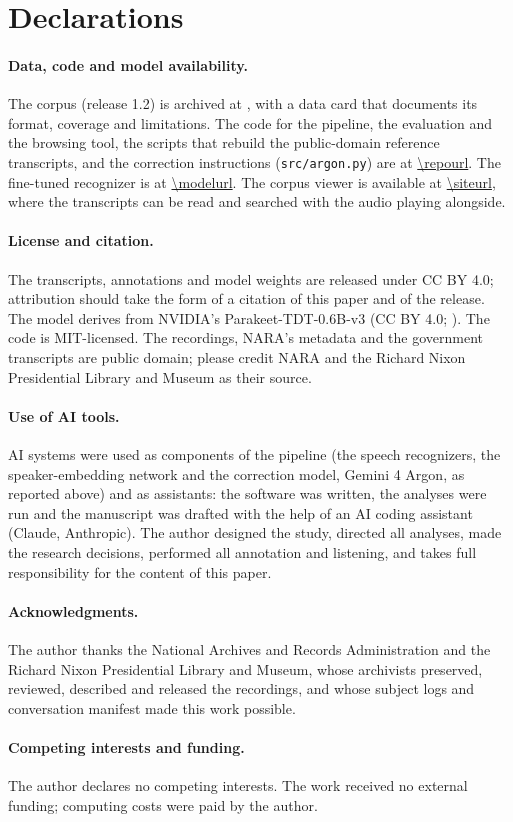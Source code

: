 \section*{Declarations}

\paragraph{Data, code and model availability.} The corpus (release 1.2) is archived at \releasedoi, with a data card that documents its format, coverage and limitations. The code for the pipeline, the evaluation and the browsing tool, the scripts that rebuild the public-domain reference transcripts, and the correction instructions (\texttt{src/argon.py}) are at \url{\repourl}. The fine-tuned recognizer is at \url{\modelurl}. The corpus viewer is available at \url{\siteurl}, where the transcripts can be read and searched with the audio playing alongside.

\paragraph{License and citation.} The transcripts, annotations and model weights are released under CC BY 4.0; attribution should take the form of a citation of this paper and of the release. The model derives from NVIDIA's Parakeet-TDT-0.6B-v3 (CC BY 4.0; \citealp{nvidia2025parakeetv3}). The code is MIT-licensed. The recordings, NARA's metadata and the government transcripts are public domain; please credit NARA and the Richard Nixon Presidential Library and Museum as their source.

\paragraph{Use of AI tools.} AI systems were used as components of the pipeline (the speech recognizers, the speaker-embedding network and the correction model, Gemini 4 Argon, as reported above) and as assistants: the software was written, the analyses were run and the manuscript was drafted with the help of an AI coding assistant (Claude, Anthropic). The author designed the study, directed all analyses, made the research decisions, performed all annotation and listening, and takes full responsibility for the content of this paper.

\paragraph{Acknowledgments.} The author thanks the National Archives and Records Administration and the Richard Nixon Presidential Library and Museum, whose archivists preserved, reviewed, described and released the recordings, and whose subject logs and conversation manifest made this work possible.

\paragraph{Competing interests and funding.} The author declares no competing interests. The work received no external funding; computing costs were paid by the author.
